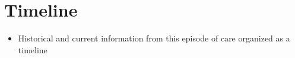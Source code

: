 \section{Timeline}
\begin{itemize}
    \item Historical and current information from this episode of care organized as a timeline

\end{itemize} 

